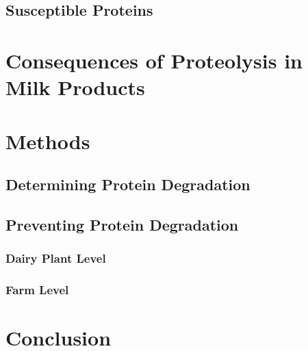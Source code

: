 \subsection{Susceptible Proteins}


\section{Consequences of Proteolysis in Milk Products}


\section{Methods}

\subsection{Determining Protein Degradation}

\subsection{Preventing Protein Degradation}

\subsubsection{Dairy Plant Level}

\subsubsection{Farm Level}



\section{Conclusion}

